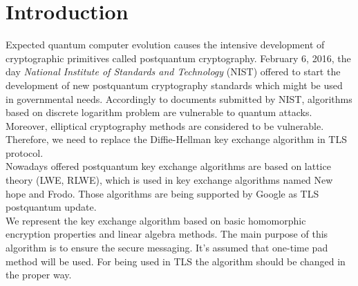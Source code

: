\section{Introduction}
	Expected quantum computer evolution causes the intensive development of cryptographic primitives called postquantum cryptography. February 6, 2016, the day \textit{National Institute of Standards and Technology} (NIST) offered to start the development of new postquantum cryptography standards which might be used in governmental needs. Accordingly to documents submitted by NIST, algorithms based on discrete logarithm problem are vulnerable to quantum attacks. Moreover, elliptical cryptography methods are considered to be vulnerable. Therefore, we need to replace the Diffie-Hellman key exchange algorithm in TLS protocol. \\ 
Nowadays offered postquantum key exchange algorithms are based on lattice theory (LWE, RLWE), which is used in key exchange algorithms named New hope and Frodo. Those algorithms are being supported by Google as TLS postquantum update. \\
We represent the key exchange algorithm based on basic homomorphic encryption properties and linear algebra methods. The main purpose of this algorithm is to ensure the secure messaging. It's assumed that one-time pad method will be used. For being used in TLS the algorithm should be changed in the proper way. 